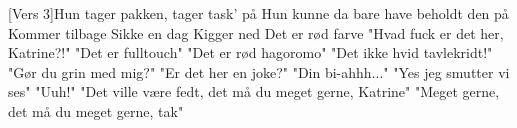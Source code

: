 \documentclass[a4paper,11pt]{article}
\begin{document}
\begin{song}
\newpage
{}[Vers 3]Hun tager pakken, tager task' på
Hun kunne da bare have beholdt den på
Kommer tilbage
Sikke en dag
Kigger ned
Det er rød farve
"Hvad fuck er det her, Katrine?!"
"Det er fulltouch"
"Det er rød hagoromo"
"Det ikke hvid tavlekridt!"
"Gør du grin med mig?"
"Er det her en joke?"
"Din bi-ahhh..."
"Yes jeg smutter vi ses"
"Uuh!"
"Det ville være fedt, det må du meget gerne, Katrine"
"Meget gerne, det må du meget gerne, tak"

  

\end{song}
\end{document}
